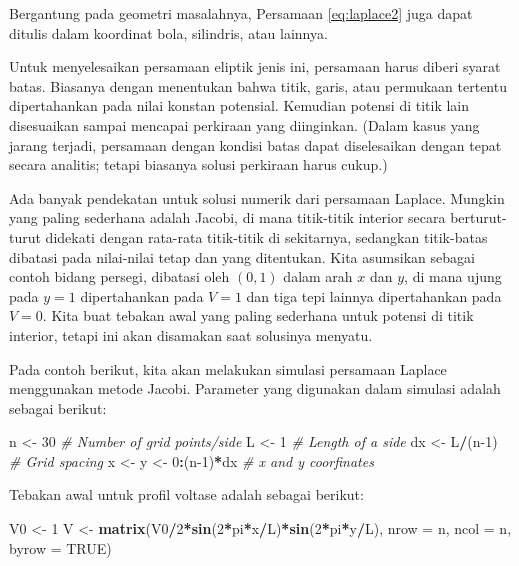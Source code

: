 \documentclass[]{book}
\newenvironment{Shaded}{\begin{snugshade}}{\end{snugshade}}
\newcommand{\CommentTok}[1]{\textcolor[rgb]{0.56,0.35,0.01}{\textit{#1}}}
\newcommand{\DataTypeTok}[1]{\textcolor[rgb]{0.13,0.29,0.53}{#1}}
\newcommand{\DecValTok}[1]{\textcolor[rgb]{0.00,0.00,0.81}{#1}}
\newcommand{\KeywordTok}[1]{\textcolor[rgb]{0.13,0.29,0.53}{\textbf{#1}}}
\newcommand{\NormalTok}[1]{#1}
\newcommand{\OperatorTok}[1]{\textcolor[rgb]{0.81,0.36,0.00}{\textbf{#1}}}
\newcommand{\OtherTok}[1]{\textcolor[rgb]{0.56,0.35,0.01}{#1}}
\newcommand{\StringTok}[1]{\textcolor[rgb]{0.31,0.60,0.02}{#1}}
\theoremstyle{definition}
\theoremstyle{definition}
\theoremstyle{definition}
\theoremstyle{remark}
\begin{document}
Bergantung pada geometri masalahnya, Persamaan \eqref{eq:laplace2} juga dapat ditulis dalam koordinat bola, silindris, atau lainnya.

Untuk menyelesaikan persamaan eliptik jenis ini, persamaan harus diberi syarat batas. Biasanya dengan menentukan bahwa titik, garis, atau permukaan tertentu dipertahankan pada nilai konstan potensial. Kemudian potensi di titik lain disesuaikan sampai mencapai perkiraan yang diinginkan. (Dalam kasus yang jarang terjadi, persamaan dengan kondisi batas dapat diselesaikan dengan tepat secara analitis; tetapi biasanya solusi perkiraan harus cukup.)

Ada banyak pendekatan untuk solusi numerik dari persamaan Laplace. Mungkin yang paling sederhana adalah Jacobi, di mana titik-titik interior secara berturut-turut didekati dengan rata-rata titik-titik di sekitarnya, sedangkan titik-batas dibatasi pada nilai-nilai tetap dan yang ditentukan. Kita asumsikan sebagai contoh bidang persegi, dibatasi oleh \(\left(0,1\right)\) dalam arah \(x\) dan \(y\), di mana ujung pada \(y = 1\) dipertahankan pada \(V = 1\) dan tiga tepi lainnya dipertahankan pada \(V = 0\). Kita buat tebakan awal yang paling sederhana untuk potensi di titik interior, tetapi ini akan disamakan saat solusinya menyatu.

Pada contoh berikut, kita akan melakukan simulasi persamaan Laplace menggunakan metode Jacobi. Parameter yang digunakan dalam simulasi adalah sebagai berikut:

\begin{Shaded}
\begin{Highlighting}[]
\NormalTok{n   <-}\StringTok{ }\DecValTok{30}                 \CommentTok{# Number of grid points/side}
\NormalTok{L   <-}\StringTok{ }\DecValTok{1}                  \CommentTok{# Length of a side}
\NormalTok{dx  <-}\StringTok{ }\NormalTok{L}\OperatorTok{/}\NormalTok{(n}\DecValTok{-1}\NormalTok{)            }\CommentTok{# Grid spacing}
\NormalTok{x   <-}\StringTok{ }\NormalTok{y    <-}\StringTok{ }\DecValTok{0}\OperatorTok{:}\NormalTok{(n}\DecValTok{-1}\NormalTok{)}\OperatorTok{*}\NormalTok{dx }\CommentTok{# x and y coorfinates}
\end{Highlighting}
\end{Shaded}

Tebakan awal untuk profil voltase adalah sebagai berikut:

\begin{Shaded}
\begin{Highlighting}[]
\NormalTok{V0  <-}\StringTok{ }\DecValTok{1}
\NormalTok{V   <-}\StringTok{ }\KeywordTok{matrix}\NormalTok{(V0}\OperatorTok{/}\DecValTok{2}\OperatorTok{*}\KeywordTok{sin}\NormalTok{(}\DecValTok{2}\OperatorTok{*}\NormalTok{pi}\OperatorTok{*}\NormalTok{x}\OperatorTok{/}\NormalTok{L)}\OperatorTok{*}\KeywordTok{sin}\NormalTok{(}\DecValTok{2}\OperatorTok{*}\NormalTok{pi}\OperatorTok{*}\NormalTok{y}\OperatorTok{/}\NormalTok{L),}
              \DataTypeTok{nrow =}\NormalTok{ n, }\DataTypeTok{ncol =}\NormalTok{ n, }\DataTypeTok{byrow =} \OtherTok{TRUE}\NormalTok{)}
\end{Highlighting}
\end{Shaded}
\end{document}
